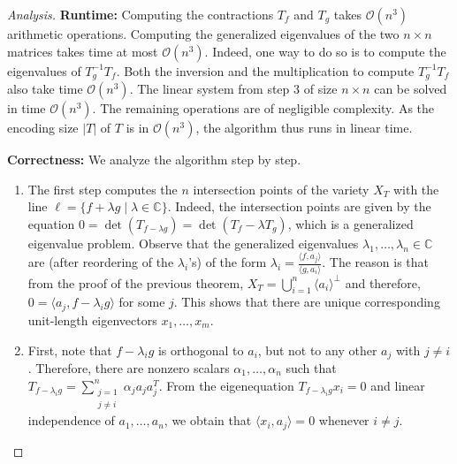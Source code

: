 \begin{proof}[Analysis]
	\textbf{Runtime:} Computing the contractions $ T_f $ and $ T_g $ takes $ \mathcal{O}(n^3) $ arithmetic operations. Computing the generalized eigenvalues of the two $ n\times n $ matrices takes time at most $ \mathcal{O}(n^3) $. Indeed, one way to do so is to compute the eigenvalues of $ T_g^{-1}T_f $. Both the inversion and the multiplication to compute $ T_g^{-1}T_f $ also take time $ \mathcal{O}(n^3) $. The linear system from step 3 of size $ n\times n $ can be solved in time $ \mathcal{O}(n^3) $. The remaining operations are of negligible complexity. As the encoding size $ |T| $ of $ T $ is in $ \mathcal{O}(n^3) $, the algorithm thus runs in linear time. 
	
	\smallskip\noindent
	\textbf{Correctness: } We analyze the algorithm step by step. 
	\begin{enumerate}
		\item The first step computes the $ n $ intersection points of the variety $ X_T $ with the line $ \ell= \{f+\lambda g \mid \lambda\in \mathbb{C}\} $. Indeed, the intersection points are given by the equation $ 0 = \det(T_{f-\lambda g}) = \det(T_{f} - \lambda T_{g}) $, which is a generalized eigenvalue problem. Observe that the generalized eigenvalues $ \lambda_1,\ldots,\lambda_n \in \mathbb{C} $ are (after reordering of the $ \lambda_i $'s) of the form $ \lambda_i = \frac{\langle f, a_j \rangle}{\langle g,a_i \rangle} $. The reason is that from the proof of the previous theorem, $ X_T = \bigcup_{i = 1}^n \langle a_i \rangle^{\perp} $ and therefore, $ 0 = \langle a_j, f-\lambda_ig \rangle $ for some $ j $. 
		This shows that there are unique corresponding unit-length eigenvectors $ x_1,\ldots,x_m $. 
		\item First, note that $ f-\lambda_ig $ is orthogonal to $ a_i $, but not to any other $ a_j $ with $ j\ne i $. Therefore, there are nonzero scalars $ \alpha_1,\ldots,\alpha_n $ such that $ T_{f-\lambda_ig} = \sum_{\substack{j = 1\\j\ne i}}^{n} \alpha_ja_ja_j^{T}$. From the eigenequation $ T_{f-\lambda_ig} x_i = 0 $ and linear independence of $ a_1,\ldots,a_n $, we obtain that $ \langle x_i, a_j \rangle = 0 $ whenever $ i\ne j $. 
		

\end{enumerate}
\end{proof}
